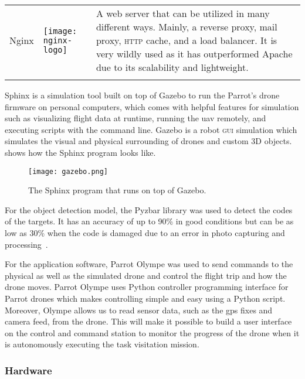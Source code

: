\documentclass[../main.tex]{subfiles}
\begin{document}
\begin{table}[p]
\begin{tabular}{ p{3cm} p{3cm} p{6cm} }
				\\ 
				\addlinespace				
		Nginx
		& 
		\raisebox{-0.9\height}
		{\texttt{[image: nginx-logo]}}
		& A web server that can be utilized in many different ways. Mainly, a 
		reverse proxy, mail proxy, \textsc{http} cache, and a load balancer. 
		It is very wildly used as it has outperformed Apache due to its 
		scalability and lightweight.
		\\ 
		\addlinespace
		
        \bottomrule
    \end{tabular}
\end{table}

Sphinx is a simulation 
tool built on top of Gazebo 
to run the Parrot's drone firmware on 
personal computers, which comes with helpful 
features for simulation such as visualizing flight 
data at runtime, running the \gls{uav} remotely, 
and executing scripts with the command line. 
Gazebo is a robot \textsc{gui} simulation 
which simulates the visual and physical surrounding 
of drones and custom 3D objects. 
 shows how the Sphinx 
program looks like. 

\begin{figure}[tbp]
    \centering
    \texttt{[image: gazebo.png]}
    \caption{The Sphinx program that runs on top of Gazebo.}
    \label{fig:gazebo}
\end{figure}

For the object detection model, the Pyzbar library was used to detect
the \qr codes of the targets.
It has an accuracy of up to 90\% in good conditions but can be as
low as 30\% when the \qr code is damaged due to an error in photo
capturing and processing~\cite{dynamsoft}.

For the application software, Parrot Olympe 
was used to send commands to the physical as well as 
the simulated drone and control the flight trip and 
how the drone moves. Parrot Olympe uses Python 
controller programming interface for Parrot drones 
which makes controlling simple and easy using a 
Python script. Moreover, Olympe allows us to read
sensor data, such as the \gls{gps} fixes and camera feed, 
from the \anafi
drone. This will make it possible to build a user interface
on the control and command station to monitor 
the progress of the drone
when it is autonomously executing the task visitation
mission.

\subsubsection{Hardware}
\end{document}
